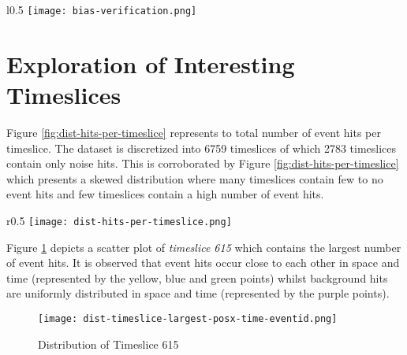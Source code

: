 \begin{wrapfigure}{l}{0.5\textwidth}
  \centering
  \texttt{[image: bias-verification.png]}
  \caption{Verification of Bias}%
  \label{fig:bias-verification}
\end{wrapfigure}

\section{Exploration of Interesting Timeslices}%
\label{sec:data-exp-interesting-timeslices}

Figure \ref{fig:dist-hits-per-timeslice} represents to total number of
event hits per timeslice. The dataset is discretized into 6759
timeslices of which 2783 timeslices contain only noise hits. This is
corroborated by Figure \ref{fig:dist-hits-per-timeslice} which
presents a skewed distribution where many timeslices contain few to no
event hits and few timeslices contain a high number of event hits.

\begin{wrapfigure}{r}{0.5\textwidth}
  \centering
  \texttt{[image: dist-hits-per-timeslice.png]}
  \caption{Distribution of event hits per timeslice}%
  \label{fig:dist-hits-per-timeslice}
\end{wrapfigure}

Figure \ref{fig:dist-timeslice-largest} depicts a scatter plot of
\emph{timeslice 615} which contains the largest number of event hits.
It is observed that event hits occur close to each other in space and
time (represented by the yellow, blue and green points) whilst
background hits are uniformly distributed in space and time
(represented by the purple points).

\begin{figure}[h]
  \centering
  \texttt{[image: dist-timeslice-largest-posx-time-eventid.png]}
  \caption{Distribution of Timeslice 615}%
  \label{fig:dist-timeslice-largest}
\end{figure}


